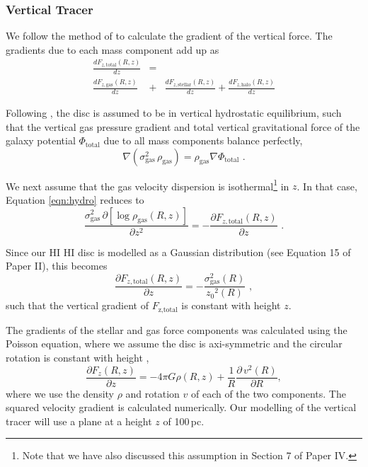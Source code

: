 \documentclass[useAMS,usenatbib]{mn2e}
\newcommand{\hi}{%
  \relax
  \ifmmode
    \textrm{\textsc{HI}}
  \else
    \textsc{H{\smaller}I}
  \fi
}
\begin{document}
\subsubsection{Vertical Tracer}
We follow the method of \citet{OBrien2010D} to calculate the gradient of the 
vertical force.
The gradients due to each mass component add up as
\begin{eqnarray}
\frac{dF_{z,\textrm{total}}(R,z)}{dz} &=& \nonumber \\
\frac{dF_{z,\textrm{gas}}(R,z)}{dz}&+&\frac{dF_{z,\textrm{stellar}}(R,z)}{dz}+\frac{dF_{z,\textrm{halo}}(R,z)}{dz} \label{eqn:zresidual}
\end{eqnarray}

Following \citet{OBrien2010D}, the disc is assumed to be in vertical 
hydrostatic equilibrium, such that the vertical gas pressure gradient 
and total vertical gravitational force of the galaxy potential 
$\Phi_\textrm{total}$ due to all mass components balance perfectly, 
\begin{equation}
\nabla\left(\sigma_\textrm{gas}^2 \,\rho_\textrm{gas}\right) = \rho_\textrm{gas} \nabla \Phi_\textrm{total}\label{eqn:hydro}\,\,.
\end{equation}

We next assume that the gas velocity dispersion is isothermal\footnote{Note 
that we have also discussed this assumption in Section 7 of Paper IV.} in $z$.
In that case, Equation \ref{eqn:hydro} reduces to
\begin{equation}
\frac{\sigma_\textrm{gas}^2 \,\partial\left[ \log \rho_\textrm{gas}(R,z)\right]}{\partial z^2} = - \frac{\partial F_{z,\textrm{total}} (R,z)}{\partial z}\,\,.\label{assumption:isothermal}
\end{equation}

Since our \hi disc is modelled as a Gaussian distribution (see Equation 
15 of Paper II), this becomes
\begin{equation}
\frac{\partial F_{z,\textrm{total}} (R,z)}{\partial z} = -\frac{\sigma^2_\textrm{gas}(R)}{{z_0}^2(R)}\label{eqn:Ftotal}\,\, ,
\end{equation}
such that the vertical gradient of $F_\textrm{z,total}$ is constant with 
height $z$.

The gradients of the stellar and gas force components was calculated 
using the Poisson equation, where we assume the disc is axi-symmetric 
and the circular rotation is constant with height \citep{OBrien2010D},
\begin{equation}
\frac{\partial F_{z} (R,z)}{\partial z} = -4\pi G \rho(R,z) + \frac{1}{R} \frac{\partial \, v^2(R)}{\partial R},\label{eqn:poissonz}
\end{equation}
where we use the density $\rho$ and rotation $v$ of each of the two components.
The squared velocity gradient is calculated numerically.
Our modelling of the vertical tracer will use a plane at a height $z$ 
of 100\,pc.
\end{document}
